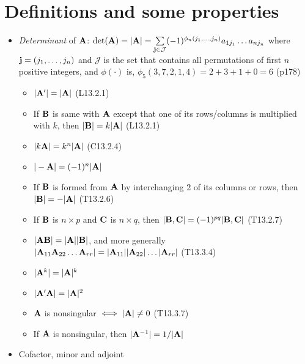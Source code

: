 \documentclass[a4paper, oneside]{book}
\begin{document}
\section{Definitions and some properties}

\begin{itemize}
\item \textit{Determinant} of $\mathbf{A}$: $\det(\mathbf{A})=|\mathbf{A}| = \sum\limits_{\mathbf{j}\in \mathcal{J}} (-1)^{\phi_n(j_1,\hdots,j_n)} a_{1j_1}\hdots a_{nj_n}$ where $\mathbf{j}=(j_1,\hdots,j_n)$ and $\mathcal{J}$ is the set that contains all permutations of first $n$ positive integers, and $\phi(\cdot)$ is, \eg $\phi_5(3,7,2,1,4) = 2+3+1+0=6$ (p178)
	\begin{itemize}
	\item $|\mathbf{A}'|=|\mathbf{A}|$ (L13.2.1)
	\item If $\mathbf{B}$ is same with $\mathbf{A}$ except that one of its rows/columns is multiplied with $k$, then $|\mathbf{B}|=k|\mathbf{A}|$ (L13.2.1)
	\item $|k\mathbf{A}|=k^n |\mathbf{A}|$ (C13.2.4)
	\item $|-\mathbf{A}|=(-1)^n |\mathbf{A}|$
	\item If $\mathbf{B}$ is formed from $\mathbf{A}$ by interchanging 2 of its columns or rows, then $|\mathbf{B}|=-|\mathbf{A}|$ (T13.2.6)
	\item If $\mathbf{B}$ is $n\times p$ and $\mathbf{C}$ is $n\times q$, then $|\mathbf{B,C}|=(-1)^{pq}|\mathbf{B,C}|$ (T13.2.7)
	\item $\mathbf{|AB|=|A||B|}$, and more generally $|\mathbf{A}_{11}\mathbf{A}_{22}\hdots \mathbf{A}_{rr}|=|\mathbf{A}_{11}||\mathbf{A}_{22}|\hdots |\mathbf{A}_{rr}|$ (T13.3.4)
	\item $|\mathbf{A}^k|=|\mathbf{A}|^k$
	\item $|\mathbf{A'A}|=|\mathbf{A}|^2$
	\item $\mathbf{A}$ is nonsingular $\iff |\mathbf{A}|\neq 0$ (T13.3.7)
	\item If $\mathbf{A}$ is nonsingular, then $|\mathbf{A}^{-1}|=1/|\mathbf{A}|$
\end{itemize}
\item Cofactor, minor and adjoint
\end{itemize}
\end{document}
